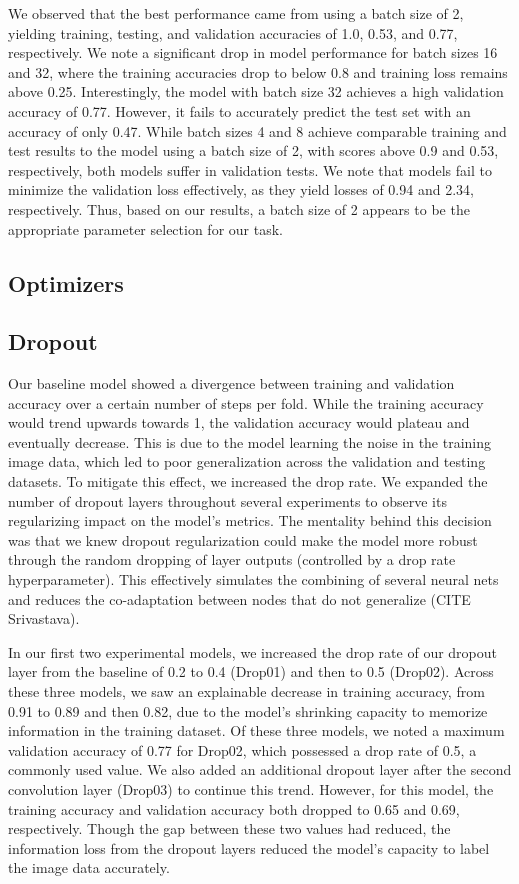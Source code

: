 \documentclass{article}
\begin{document}
We observed that the best performance came from using a batch size of 2, yielding training, testing, and validation accuracies of 1.0, 0.53, and 0.77, respectively. We note a significant drop in model performance for batch sizes 16 and 32, where the training accuracies drop to below 0.8 and training loss remains above 0.25. Interestingly, the model with batch size 32 achieves a high validation accuracy of 0.77. However, it fails to accurately predict the test set with an accuracy of only 0.47. While batch sizes 4 and 8 achieve comparable training and test results to the model using a batch size of 2, with scores above 0.9 and 0.53, respectively, both models suffer in validation tests. We note that models fail to minimize the validation loss effectively, as they yield losses of 0.94 and 2.34, respectively. Thus, based on our results, a batch size of 2 appears to be the appropriate parameter selection for our task.

\subsection{Optimizers}



\subsection{Dropout}

Our baseline model showed a divergence between training and validation accuracy over a certain number of steps per fold. While the training accuracy would trend upwards towards 1, the validation accuracy would plateau and eventually decrease. This is due to the model learning the noise in the training image data, which led to poor generalization across the validation and testing datasets. To mitigate this effect, we increased the drop rate. We expanded the number of dropout layers throughout several experiments to observe its regularizing impact on the model’s metrics. The mentality behind this decision was that we knew dropout regularization could make the model more robust through the random dropping of layer outputs (controlled by a drop rate hyperparameter). This effectively simulates the combining of several neural nets and reduces the co-adaptation between nodes that do not generalize (CITE Srivastava). 

In our first two experimental models, we increased the drop rate of our dropout layer from the baseline of 0.2 to 0.4 (Drop01) and then to 0.5 (Drop02). Across these three models, we saw an explainable decrease in training accuracy, from 0.91 to 0.89 and then 0.82, due to the model’s shrinking capacity to memorize information in the training dataset. Of these three models, we noted a maximum validation accuracy of 0.77 for Drop02, which possessed a drop rate of 0.5, a commonly used value. We also added an additional dropout layer after the second convolution layer (Drop03) to continue this trend. However, for this model, the training accuracy and validation accuracy both dropped to 0.65 and 0.69, respectively. Though the gap between these two values had reduced, the information loss from the dropout layers reduced the model’s capacity to label the image data accurately.
\end{document}

